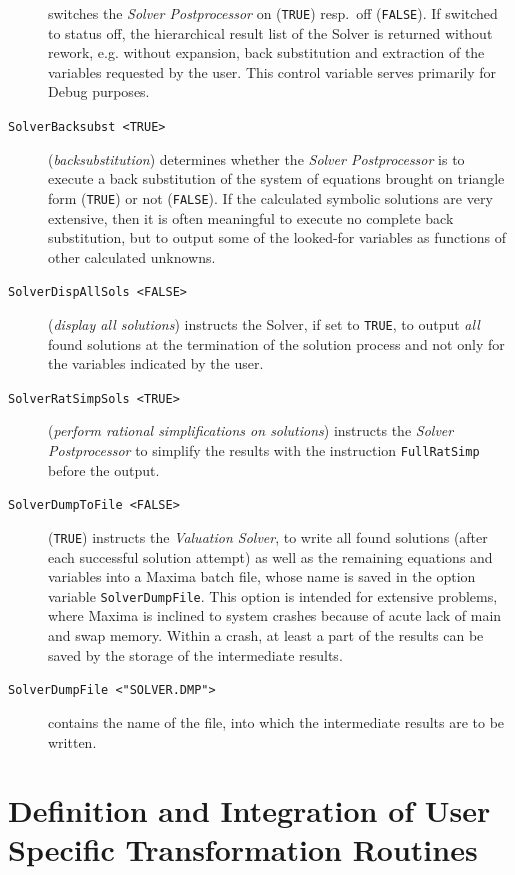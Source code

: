 \begin{description}
switches the {\em Solver 
Postprocessor}  on (\verb+TRUE+) resp.\ off (\verb+FALSE+).  If switched to status off,  the hierarchical result list of the Solver is returned without rework, e.g. without expansion, back substitution and extraction of the variables requested by the user. This control variable serves primarily for Debug purposes.
%
\item[{\tt SolverBacksubst <TRUE>}] ({\em backsubstitution}) 
determines whether the {\em Solver Postprocessor}  is to execute a back substitution of the system of equations brought on triangle form (\verb+TRUE+) or not (\verb+FALSE+). If the calculated symbolic solutions are very extensive, then it is often meaningful to execute no complete back substitution, but to output some of the looked-for variables as functions of other calculated unknowns.
%
\item[{\tt SolverDispAllSols <FALSE>}] ({\em display all solutions}) 
instructs the Solver, if set to \verb+TRUE+,  to output {\em all} found solutions at the termination of the solution process  and not only for the variables indicated by the user.
%
\item[{\tt SolverRatSimpSols <TRUE>}] ({\em perform rational simplifications on solutions}) 
instructs the {\em Solver Postprocessor}  to simplify the results  with the instruction \verb+FullRatSimp+ before the output.
%
\item[{\tt SolverDumpToFile <FALSE>}] 
 (\verb+TRUE+) instructs the {\em Valuation Solver},  to write all found solutions (after each successful solution attempt) as well as the remaining equations and variables into a Maxima batch file, whose name is saved in the option variable  \verb+SolverDumpFile+. This option is intended for extensive problems, where Maxima is inclined  to system crashes because of  acute lack of main and swap memory.
Within a crash,  at least a part of the results can be saved by the storage of the intermediate results.
%

\item[{\tt SolverDumpFile <"{}SOLVER.DMP"{}>}] 
contains the name of the file, into which the intermediate results are to be written.

\end{description}




\section[user specific transformation routines]{Definition and
Integration of User Specific Transformation Routines\label{SolverTransforms}} %

